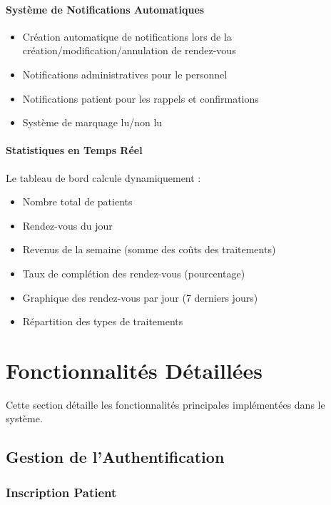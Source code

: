 \documentclass[12pt,a4paper]{report}
\begin{document}
\paragraph{Système de Notifications Automatiques}

\begin{itemize}
    \item Création automatique de notifications lors de la création/modification/annulation de rendez-vous
    \item Notifications administratives pour le personnel
    \item Notifications patient pour les rappels et confirmations
    \item Système de marquage lu/non lu
\end{itemize}

\paragraph{Statistiques en Temps Réel}

Le tableau de bord calcule dynamiquement :
\begin{itemize}
    \item Nombre total de patients
    \item Rendez-vous du jour
    \item Revenus de la semaine (somme des coûts des traitements)
    \item Taux de complétion des rendez-vous (pourcentage)
    \item Graphique des rendez-vous par jour (7 derniers jours)
    \item Répartition des types de traitements
\end{itemize}

\section{Fonctionnalités Détaillées}

Cette section détaille les fonctionnalités principales implémentées dans le système.

\subsection{Gestion de l'Authentification}

\subsubsection{Inscription Patient}
\end{document}

